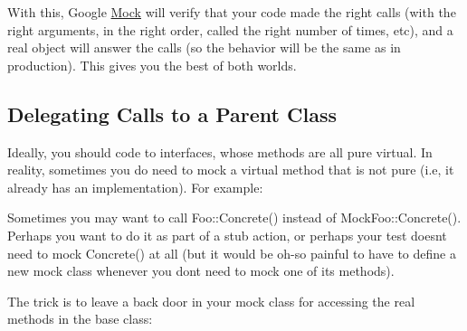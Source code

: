 With this, Google \mbox{\hyperlink{classMock}{Mock}} will verify that your code made the right calls (with the right arguments, in the right order, called the right number of times, etc), and a real object will answer the calls (so the behavior will be the same as in production). This gives you the best of both worlds.

\subsection*{Delegating Calls to a Parent Class}

Ideally, you should code to interfaces, whose methods are all pure virtual. In reality, sometimes you do need to mock a virtual method that is not pure (i.\+e, it already has an implementation). For example\+:


\begin{DoxyCode}{0}
\DoxyCodeLine{}
\DoxyCodeLine{\};}
\DoxyCodeLine{}
\DoxyCodeLine{\};}
\end{DoxyCode}


Sometimes you may want to call {\ttfamily Foo\+::\+Concrete()} instead of {\ttfamily Mock\+Foo\+::\+Concrete()}. Perhaps you want to do it as part of a stub action, or perhaps your test doesn\textquotesingle{}t need to mock {\ttfamily Concrete()} at all (but it would be oh-\/so painful to have to define a new mock class whenever you don\textquotesingle{}t need to mock one of its methods).

The trick is to leave a back door in your mock class for accessing the real methods in the base class\+:


\begin{DoxyCode}{0}
\DoxyCodeLine{}
\DoxyCodeLine{\};}
\end{DoxyCode}



